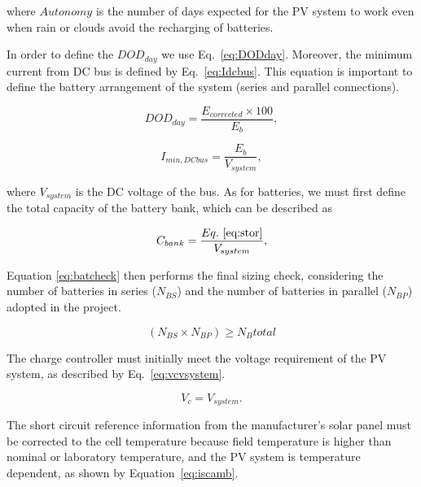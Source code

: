 \noindent where $Autonomy$ is the number of days expected for the PV system to work even when rain or clouds avoid the recharging of batteries.

In order to define the $DOD_{day}$ we use Eq.~\eqref{eq:DODday}. Moreover, the minimum current from DC bus is defined by Eq.~\eqref{eq:Idcbus}. This equation is important to define the battery arrangement of the system (series and parallel connections).

\begin{equation}
\label{eq:DODday}
DOD_{day} = \dfrac{E_{corrected} \times 100}{E_{b}},
\end{equation}

\begin{equation}
\label{eq:Idcbus}
I_{min,DCbus} = \dfrac{E_{b}}{V_{system}},
\end{equation}

\noindent where $V_{system}$ is the DC voltage of the bus. As for batteries, we must first define the total capacity of the battery bank, which can be described as

\begin{equation}
\label{eq:Cbank}
C_{bank} = \dfrac{Eq.~\eqref{eq:stor}}{V_{system}},
\end{equation}

%

Equation \ref{eq:batcheck} then performs the final sizing check, considering the number of batteries in series ($ N_{BS} $) and the number of batteries in parallel ($ N_{BP} $) adopted in the project.

\begin{equation}
\label{eq:batcheck}
\left( N_{BS} \times N_{BP} \right) \geq N_{B}total
\end{equation}

The charge controller must initially meet the voltage requirement of the PV system, as described by Eq.~\eqref{eq:vcvsystem}.
 
\begin{equation}
\label{eq:vcvsystem}
V_{c} = V_{system}.
\end{equation}

The short circuit reference information from the manufacturer's solar panel must be corrected to the cell temperature because field temperature is higher than nominal or laboratory temperature, and the PV system is temperature dependent, as shown by Equation~\eqref{eq:iscamb}. 

